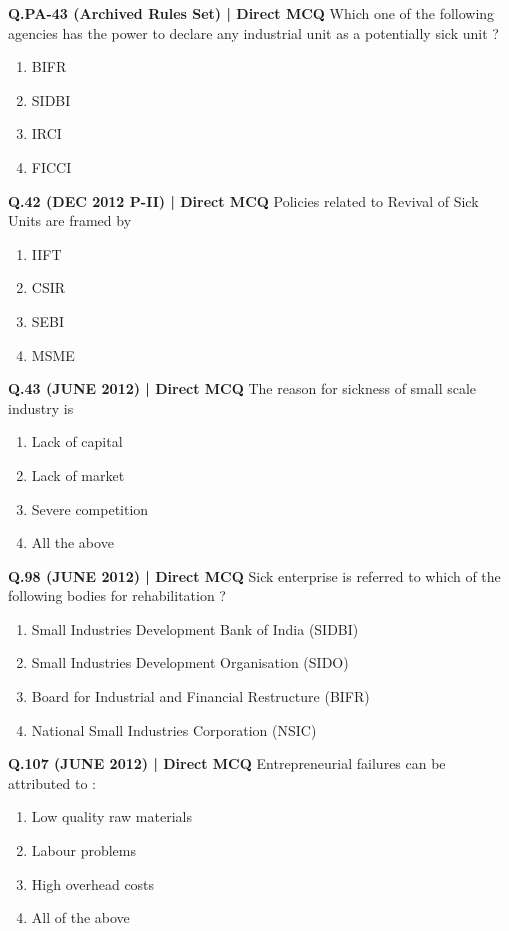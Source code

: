\documentclass{article}
\begin{document}
\textbf{Q.PA-43 (Archived Rules Set) | Direct MCQ}
Which one of the following agencies has the power to declare any industrial unit as a potentially sick unit ?
\begin{enumerate}[label=(\arabic*)]
    \item BIFR
    \item SIDBI
    \item IRCI
    \item FICCI
\end{enumerate}

\textbf{Q.42 (DEC 2012 P-II) | Direct MCQ}
Policies related to Revival of Sick Units are framed by
\begin{enumerate}[label=(\arabic*)]
    \item IIFT
    \item CSIR
    \item SEBI
    \item MSME
\end{enumerate}

\textbf{Q.43 (JUNE 2012) | Direct MCQ}
The reason for sickness of small scale industry is
\begin{enumerate}[label=(\arabic*)]
    \item Lack of capital
    \item Lack of market
    \item Severe competition
    \item All the above
\end{enumerate}

\textbf{Q.98 (JUNE 2012) | Direct MCQ}
Sick enterprise is referred to which of the following bodies for rehabilitation ?
\begin{enumerate}[label=(\arabic*)]
    \item Small Industries Development Bank of India (SIDBI)
    \item Small Industries Development Organisation (SIDO)
    \item Board for Industrial and Financial Restructure (BIFR)
    \item National Small Industries Corporation (NSIC)
\end{enumerate}

\textbf{Q.107 (JUNE 2012) | Direct MCQ}
Entrepreneurial failures can be attributed to :
\begin{enumerate}[label=(\arabic*)]
    \item Low quality raw materials
    \item Labour problems
    \item High overhead costs
    \item All of the above
\end{enumerate}
\end{document}
